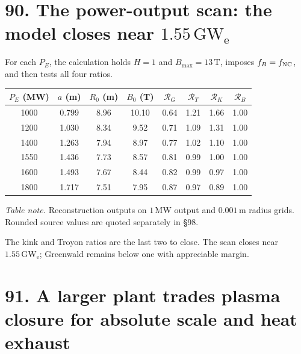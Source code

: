 \documentclass[11pt]{article}
\begin{document}
\section*{90. The power-output scan: the model closes near $1.55\,\mathrm{GW_e}$}

For each $P_E$, the calculation holds $H=1$ and $B_{\max}=13\,\mathrm T$, imposes
$f_B=f_{\rm NC}$, and then tests all four ratios.

\par\noindent\begin{minipage}{\linewidth}
\begin{center}
\begin{tabular}{c c c c c c c c}
$P_E$ (MW) & $a$ (m) & $R_0$ (m) & $B_0$ (T) & $\mathcal R_G$
& $\mathcal R_T$ & $\mathcal R_K$ & $\mathcal R_B$\\
\hline
1000 & 0.799 & 8.96 & 10.10 & 0.64 & 1.21 & 1.66 & 1.00\\
1200 & 1.030 & 8.34 & 9.52 & 0.71 & 1.09 & 1.31 & 1.00\\
1400 & 1.263 & 7.94 & 8.97 & 0.77 & 1.02 & 1.10 & 1.00\\
1550 & 1.436 & 7.73 & 8.57 & 0.81 & 0.99 & 1.00 & 1.00\\
1600 & 1.493 & 7.67 & 8.44 & 0.82 & 0.99 & 0.97 & 1.00\\
1800 & 1.717 & 7.51 & 7.95 & 0.87 & 0.97 & 0.89 & 1.00
\end{tabular}
\end{center}
{\small\textit{Table note.} Reconstruction outputs on $1\,\mathrm{MW}$ output and
$0.001\,\mathrm m$ radius grids. Rounded source values are quoted separately in \S98.\par}
\end{minipage}\par


The kink and Troyon ratios are the last two to close. The scan closes near
$1.55\,\mathrm{GW_e}$; Greenwald remains below one with appreciable margin.


\section*{91. A larger plant trades plasma closure for absolute scale and heat exhaust}
\end{document}
